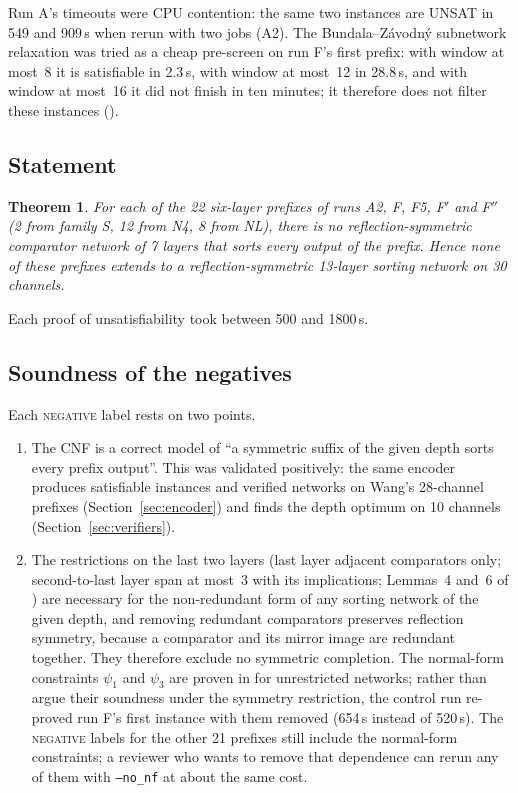 \documentclass[11pt,a4paper]{article}
\theoremstyle{plain}
\newtheorem{theorem}{Theorem}
\theoremstyle{definition}
\theoremstyle{remark}
\newcommand{\NEG}{\textsc{negative}}
\begin{document}
Run A's timeouts were CPU contention: the same two instances are UNSAT in 549 and 909\,s when rerun with two jobs (A2). The Bundala--Z\'avodn\'y subnetwork relaxation was tried as a cheap pre-screen on run F's first prefix: with window at most~8 it is satisfiable in 2.3\,s, with window at most~12 in 28.8\,s, and with window at most~16 it did not finish in ten minutes; it therefore does not filter these instances ().

\subsection{Statement}

\begin{theorem}\label{thm:n30}
For each of the 22 six-layer prefixes of runs A2, F, F5, F$'$ and F$''$ (2 from family S, 12 from N4, 8 from NL), there is no reflection-symmetric comparator network of 7 layers that sorts every output of the prefix. Hence none of these prefixes extends to a reflection-symmetric 13-layer sorting network on 30 channels.
\end{theorem}

Each proof of unsatisfiability took between 500 and 1800\,s.

\subsection{Soundness of the negatives}\label{sec:sound}

Each \NEG{} label rests on two points.

\begin{enumerate}
\item The CNF is a correct model of ``a symmetric suffix of the given depth sorts every prefix output''. This was validated positively: the same encoder produces satisfiable instances and verified networks on Wang's 28-channel prefixes (Section~\ref{sec:encoder}) and finds the depth optimum on 10 channels (Section~\ref{sec:verifiers}).
\item The restrictions on the last two layers (last layer adjacent comparators only; second-to-last layer span at most~3 with its implications; Lemmas~4 and~6 of \cite{CCEMS19}) are necessary for the non-redundant form of any sorting network of the given depth, and removing redundant comparators preserves reflection symmetry, because a comparator and its mirror image are redundant together. They therefore exclude no symmetric completion. The normal-form constraints $\psi_1$ and $\psi_3$ are proven in \cite{CCEMS19} for unrestricted networks; rather than argue their soundness under the symmetry restriction, the control run re-proved run F's first instance with them removed (654\,s instead of 520\,s). The \NEG{} labels for the other 21 prefixes still include the normal-form constraints; a reviewer who wants to remove that dependence can rerun any of them with \texttt{--no\_nf} at about the same cost.
\end{enumerate}
\end{document}
